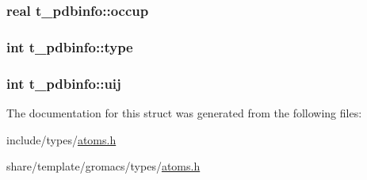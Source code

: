 \hypertarget{structt__pdbinfo_a3da8bcfa53a25a6845f422837eb66e1a}{
\subsubsection[{occup}]{\setlength{\rightskip}{0pt plus 5cm}real {\bf t\-\_\-pdbinfo\-::occup}}}\label{structt__pdbinfo_a3da8bcfa53a25a6845f422837eb66e1a}
\hypertarget{structt__pdbinfo_a21b6c83fcd63508a0c69863cce44c971}{
\subsubsection[{type}]{\setlength{\rightskip}{0pt plus 5cm}int {\bf t\-\_\-pdbinfo\-::type}}}\label{structt__pdbinfo_a21b6c83fcd63508a0c69863cce44c971}
\hypertarget{structt__pdbinfo_ae44927d120b35fe2707bc84f12bbee4d}{
\subsubsection[{uij}]{\setlength{\rightskip}{0pt plus 5cm}int {\bf t\-\_\-pdbinfo\-::uij}}}\label{structt__pdbinfo_ae44927d120b35fe2707bc84f12bbee4d}


\-The documentation for this struct was generated from the following files\-:\begin{DoxyCompactItemize}
\item 
include/types/\hyperlink{include_2types_2atoms_8h}{atoms.\-h}\item 
share/template/gromacs/types/\hyperlink{share_2template_2gromacs_2types_2atoms_8h}{atoms.\-h}\end{DoxyCompactItemize}
